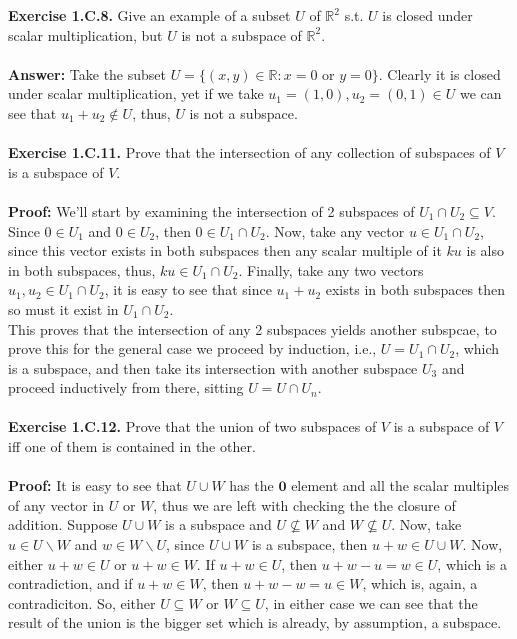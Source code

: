 \documentclass{article}
\begin{document}
	\textbf{Exercise 1.C.8.} Give an example of a subset $U$ of $\mathbb{R}^2$ s.t. $U$ is closed under scalar multiplication, but $U$ is not a subspace of $\mathbb{R}^2$. \\ \\
	\textbf{Answer:} Take the subset $U = \{(x, y) \in \mathbb{R} : x = 0 \text{ or } y = 0\}$. Clearly it is closed under scalar multiplication, yet if we take $u_1 = (1, 0), u_2 = (0, 1) \in U$ we can see that $u_1 + u_2 \not \in U$, thus, $U$ is not a subspace. \\ \\
	\textbf{Exercise 1.C.11.} Prove that the intersection of any collection of subspaces of $V$ is a subspace of $V$. \\ \\
	\textbf{Proof:} We'll start by examining the intersection of 2 subspaces of $U_1 \cap U_2 \subseteq V$. Since $0 \in U_1$ and $0 \in U_2$, then $0 \in U_1 \cap U_2$. Now, take any vector $u \in U_1 \cap U_2$, since this vector exists in both subspaces then any scalar multiple of it $ku$ is also in both subspaces, thus, $ku \in U_1 \cap U_2$. Finally, take any two vectors $u_1, u_2 \in U_1 \cap U_2$, it is easy to see that since $u_1 + u_2$ exists in both subspaces then so must it exist in $U_1 \cap U_2$. \\
	This proves that the intersection of any 2 subspaces yields another subspcae, to prove this for the general case we proceed by induction, i.e., $U = U_1 \cap U_2$, which is a subspace, and then take its intersection with another subspace $U_3$ and proceed inductively from there, sitting $U = U \cap U_n$. \\ \\
	\textbf{Exercise 1.C.12.} Prove that the union of two subspaces of $V$ is a subspace of $V$ iff one of them is contained in the other. \\ \\
	\textbf{Proof:} It is easy to see that $U \cup W$ has the $\mathbf{0}$ element and all the scalar multiples of any vector in $U$ or $W$, thus we are left with checking the the closure of addition. Suppose $U \cup W$ is a subspace and $U \nsubseteq W$ and $W \nsubseteq U$. Now, take $u \in U \backslash W$ and $w \in W \backslash U$, since $U \cup W$ is a subspace, then $u + w \in U \cup W$. Now, either $u + w \in U$ or $u + w \in W$. If $u + w \in U$, then $u + w - u = w \in U$, which is a contradiction, and if $u + w \in W$, then $u + w - w = u \in W$, which is, again, a contradiciton. So, either $U \subseteq W$ or $W \subseteq U$, in either case we can see that the result of the union is the bigger set which is already, by assumption, a subspace. \\ \\
\end{document}
